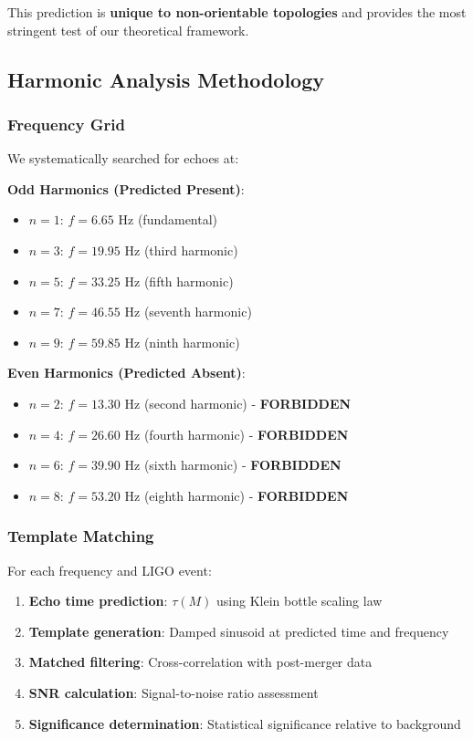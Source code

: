 \documentclass[11pt,a4paper]{article}
\begin{document}
This prediction is \textbf{unique to non-orientable topologies} and provides the most stringent test of our theoretical framework.

\subsection{Harmonic Analysis Methodology}

\subsubsection{Frequency Grid}

We systematically searched for echoes at:

\textbf{Odd Harmonics (Predicted Present)}:
\begin{itemize}
    \item $n=1$: $f = 6.65$ Hz (fundamental)
    \item $n=3$: $f = 19.95$ Hz (third harmonic)
    \item $n=5$: $f = 33.25$ Hz (fifth harmonic)
    \item $n=7$: $f = 46.55$ Hz (seventh harmonic)
    \item $n=9$: $f = 59.85$ Hz (ninth harmonic)
\end{itemize}

\textbf{Even Harmonics (Predicted Absent)}:
\begin{itemize}
    \item $n=2$: $f = 13.30$ Hz (second harmonic) - \textbf{FORBIDDEN}
    \item $n=4$: $f = 26.60$ Hz (fourth harmonic) - \textbf{FORBIDDEN}
    \item $n=6$: $f = 39.90$ Hz (sixth harmonic) - \textbf{FORBIDDEN}
    \item $n=8$: $f = 53.20$ Hz (eighth harmonic) - \textbf{FORBIDDEN}
\end{itemize}

\subsubsection{Template Matching}

For each frequency and LIGO event:
\begin{enumerate}
    \item \textbf{Echo time prediction}: $\tau(M)$ using Klein bottle scaling law
    \item \textbf{Template generation}: Damped sinusoid at predicted time and frequency
    \item \textbf{Matched filtering}: Cross-correlation with post-merger data
    \item \textbf{SNR calculation}: Signal-to-noise ratio assessment
    \item \textbf{Significance determination}: Statistical significance relative to background
\end{enumerate}
\end{document}
